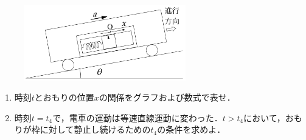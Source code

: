 \begin{enumerate}[I]
  \begin{figure}[H]
    \centering
    \includegraphics[width=7cm]{fig/fig_1_7_3.pdf}
    \caption{}
  \end{figure}
  \begin{enumerate}[resume, label=\textbf{問\arabic*}]
    \item {\hzw}時刻$t$とおもりの位置$x$の関係をグラフおよび数式で表せ．
    \item {\hzw}時刻$t = t_4$で，電車の運動は等速直線運動に変わった．$t > t_4$において，おもりが枠に対して静止し続けるための$t_4$の条件を求めよ．
  \end{enumerate}
\end{enumerate}


